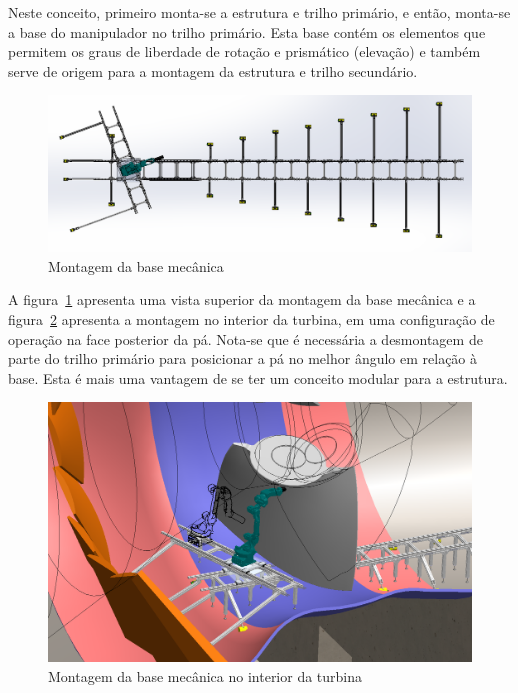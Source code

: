 Neste conceito, primeiro monta-se a estrutura e trilho
primário, e então, monta-se a base do manipulador no trilho primário. Esta base
contém os elementos que permitem os graus de liberdade de rotação e prismático
(elevação) e também serve de origem para a montagem da estrutura e trilho
secundário. 

\begin{figure}[h!]
	\centering
	\includegraphics[width=0.9\columnwidth]{method/figs/construcao/EMMA_Base_Secundaria_04}
	\caption{Montagem da base mecânica}
    \label{fig::EMMA_Base_Secundaria_04}
\end{figure}

A figura~\ref{fig::EMMA_Base_Secundaria_04} apresenta uma vista superior da
montagem da base mecânica e a figura~\ref{fig::EMMA_Base_Secundaria_01}
apresenta a montagem no interior da turbina, em uma configuração de operação na
face posterior da pá. Nota-se que é necessária a desmontagem de parte do trilho
primário para posicionar a pá no melhor ângulo em relação à base. Esta é mais
uma vantagem de se ter um conceito modular para a estrutura.

\begin{figure}[h!]
	\centering
	\includegraphics[width=0.9\columnwidth]{method/figs/construcao/EMMA_Base_Secundaria_01}
	\caption{Montagem da base mecânica no interior da turbina}
    \label{fig::EMMA_Base_Secundaria_01}
\end{figure}


